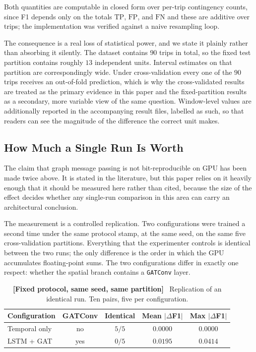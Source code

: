 \documentclass[journal]{IEEEtran}
\begin{document}
Both quantities are computable in closed form over per-trip contingency counts, since F1 depends only on the totals $\mathrm{TP}$, $\mathrm{FP}$, and $\mathrm{FN}$ and these are additive over trips; the implementation was verified against a naive resampling loop.

The consequence is a real loss of statistical power, and we state it plainly rather than absorbing it silently. The dataset contains $90$ trips in total, so the fixed test partition contains roughly $13$ independent units. Interval estimates on that partition are correspondingly wide. Under cross-validation every one of the $90$ trips receives an out-of-fold prediction, which is why the cross-validated results are treated as the primary evidence in this paper and the fixed-partition results as a secondary, more variable view of the same question. Window-level values are additionally reported in the accompanying result files, labelled as such, so that readers can see the magnitude of the difference the correct unit makes.

\subsection{How Much a Single Run Is Worth}
\label{sec:replication}
The claim that graph message passing is not bit-reproducible on GPU has been
made twice above. It is stated in the literature, but this paper relies on it
heavily enough that it should be measured here rather than cited, because the
size of the effect decides whether any single-run comparison in this area can
carry an architectural conclusion.

The measurement is a controlled replication. Two configurations were trained a
second time under the same protocol stamp, at the same seed, on the same five
cross-validation partitions. Everything that the experimenter controls is
identical between the two runs; the only difference is the order in which the
GPU accumulates floating-point sums. The two configurations differ in exactly
one respect: whether the spatial branch contains a \texttt{GATConv} layer.

\begin{table}[!htbp]
  \centering
  \caption{\textbf{[Fixed protocol, same seed, same partition]}~ Replication of
  an identical run. Ten pairs, five per configuration.}
  \label{tab:replication}
  \renewcommand{\arraystretch}{1.2}
  \footnotesize
  \begin{tabular}{@{}lcccc@{}}
    \toprule
    \textbf{Configuration} & \textbf{GATConv} & \textbf{Identical} &
    \textbf{Mean $|\Delta$F1$|$} & \textbf{Max $|\Delta$F1$|$} \\ \midrule
    Temporal only & no  & $5/5$ & $0.0000$ & $0.0000$ \\
    LSTM + GAT    & yes & $0/5$ & $0.0195$ & $0.0414$ \\ \bottomrule
  \end{tabular}
\end{table}
\end{document}
